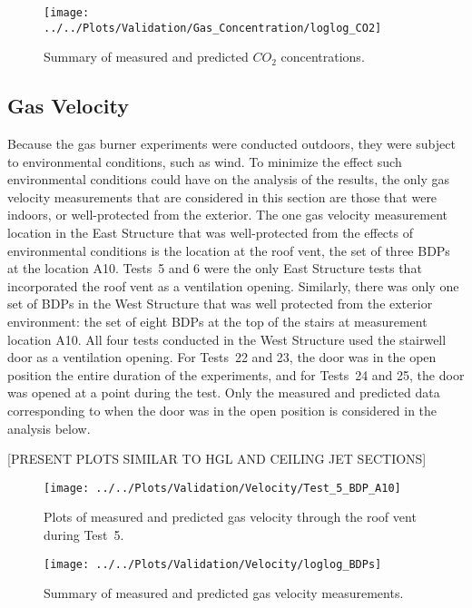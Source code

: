 \begin{figure}[!h]
	\centering
	\texttt{[image: ../../Plots/Validation/Gas\_Concentration/loglog\_CO2]}
	\caption{Summary of measured and predicted $CO_2$ concentrations.}
	\label{fig:loglog_CO2}
\end{figure}

\clearpage
\subsection{Gas Velocity}
Because the gas burner experiments were conducted outdoors, they were subject to environmental conditions, such as wind. To minimize the effect such environmental conditions could have on the analysis of the results, the only gas velocity measurements that are considered in this section are those that were indoors, or well-protected from the exterior. The one gas velocity measurement location in the East Structure that was well-protected from the effects of environmental conditions is the location at the roof vent, the set of three BDPs at the location A10. Tests~5 and 6 were the only East Structure tests that incorporated the roof vent as a ventilation opening. Similarly, there was only one set of BDPs in the West Structure that was well protected from the exterior environment: the set of eight BDPs at the top of the stairs at measurement location A10. All four tests conducted in the West Structure used the stairwell door as a ventilation opening. For Tests~22 and 23, the door was in the open position the entire duration of the experiments, and for Tests~24 and 25, the door was opened at a point during the test. Only the measured and predicted data corresponding to when the door was in the open position is considered in the analysis below. 

[PRESENT PLOTS SIMILAR TO HGL AND CEILING JET SECTIONS]
\begin{figure}[!h]
	\centering
	\texttt{[image: ../../Plots/Validation/Velocity/Test\_5\_BDP\_A10]}
	\caption[Plots of measured and predicted gas velocity through the roof vent during Test~5.]{Plots of measured and predicted gas velocity through the roof vent during Test~5.}
	\label{fig:Test5_BDPs}
\end{figure}

\begin{figure}[!h]
	\centering
	\texttt{[image: ../../Plots/Validation/Velocity/loglog\_BDPs]}
	\caption{Summary of measured and predicted gas velocity measurements.}
	\label{fig:loglog_BDPs}
\end{figure}

